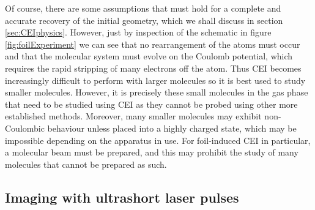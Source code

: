 
Of course, there are some assumptions that must hold for a complete and accurate recovery of the initial geometry, which we shall discuss in section \ref{sec:CEIphysics}. However, just by inspection of the schematic in figure \ref{fig:foilExperiment} we can see that no rearrangement of the atoms must occur\footnotemark~ and that the molecular system must evolve on the Coulomb potential, which requires the rapid stripping of many electrons off the atom. Thus CEI becomes increasingly difficult to perform with larger molecules so it is best used to study smaller molecules. However, it is precisely these small molecules in the gas phase that need to be studied using CEI as they cannot be probed using other more established methods. Moreover, many smaller molecules may exhibit non-Coulombic behaviour unless placed into a highly charged state, which may be impossible depending on the apparatus in use. For foil-induced CEI in particular, a molecular beam must be prepared, and this may prohibit the study of many molecules that cannot be prepared as such.


\subsection{Imaging with ultrashort laser pulses}\label{sec:laserCEI}

